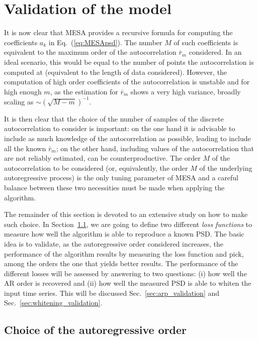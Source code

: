 \documentclass{aa}
\begin{document}
\section{Validation of the model}\label{sec:validation}
It is now clear that MESA provides a recursive formula for computing the coefficients $a_k$ in Eq.~(\ref{eq:MESApsd}). The number $M$ of such coefficients is equivalent to the maximum order of the autocorrelation $\bar{r}_m$ considered. In an ideal scenario, this would be equal to the number of points the autocorrelation is computed at (equivalent to the length of data considered). However, the computation of high order coefficients of the autocorrelation is unstable and for high enough $m$, as the estimation for  $\bar{r}_m$ shows a very high variance, broadly scaling as $\sim \left(\sqrt{M - m}\right)^{-1}$.

It is then clear that the choice of the number of samples of the discrete autocorrelation to consider is important: 
on the one hand it is advisable to include as much knowledge of the autocorrelation as possible, leading to include all the known $\bar{r}_m$; on the other hand, including values of the autocorrelation that are not reliably estimated, can be counterproductive.
The order $M$ of the autocorrelation to be considered (or, equivalently, the order $M$ of the underlying autoregressive process) is the only tuning parameter of MESA and a careful balance between these two necessities must be made when applying the algorithm.

The remainder of this section is devoted to an extensive study on how to make such choice.
In Section~\ref{sec:optimizers}, we are going to define two different \textit{loss functions} to measure how well the 
algorithm is able to reproduce a known PSD.
The basic idea is to validate, as the autoregressive order considered increases, the performance of the algorithm results 
by measuring the loss function and pick, among the orders the one that yields better results.
The performance of the different losses will be assessed by answering to two questions: (i) how well the AR order is recovered and (ii) how well the measured PSD is able to whiten the input time series.
This will be discussed Sec.~\ref{sec:arp_validation} and Sec.~\ref{sec:whitening_validation}.

\subsection{Choice of the autoregressive order}\label{sec:optimizers} 
\end{document}

